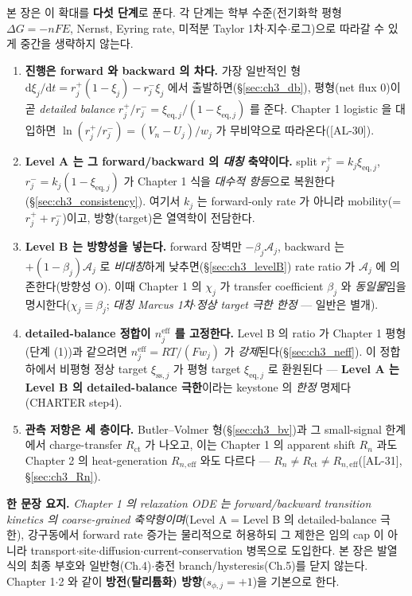 \documentclass[11pt,a4paper]{article}
\newcommand{\dd}{\mathrm{d}}
\newcommand{\eff}{\mathrm{eff}}
\newcommand{\eq}{\mathrm{eq}}
\newcommand{\ct}{\mathrm{ct}}
\newcommand{\sstat}{\mathrm{ss}}
\newcommand{\AL}[1]{\textsf{[AL-#1]}}
\begin{document}
본 장은 이 확대를 \textbf{다섯 단계}로 푼다. 각 단계는 학부 수준(전기화학 평형 $\Delta G=-nF E$, Nernst,
Eyring rate, 미적분 Taylor 1차$\cdot$지수$\cdot$로그)으로 따라갈 수 있게 중간을 생략하지 않는다.
\begin{enumerate}[label=\textbf{(\arabic*)},leftmargin=2.2em]
\item \textbf{진행은 forward 와 backward 의 차다.} 가장 일반적인 형 $\dd\xi_j/\dd t=r_j^+(1-\xi_j)-r_j^-\xi_j$
  에서 출발하면(\S\ref{sec:ch3_db}), 평형(net flux $0$)이 곧 \emph{detailed balance} $r_j^+/r_j^-=\xi_{\eq,j}/(1-\xi_{\eq,j})$
  를 준다. Chapter 1 logistic 을 대입하면 $\ln(r_j^+/r_j^-)=(V_n-U_j)/w_j$ 가 무비약으로 따라온다(\AL{30}).
\item \textbf{Level A 는 그 forward/backward 의 \emph{대칭} 축약이다.} split $r_j^+=k_j\xi_{\eq,j}$,
  $r_j^-=k_j(1-\xi_{\eq,j})$ 가 Chapter 1 식을 \emph{대수적 항등}으로 복원한다(\S\ref{sec:ch3_consistency}).
  여기서 $k_j$ 는 forward-only rate 가 아니라 mobility(=$r_j^++r_j^-$)이고, 방향(target)은 열역학이 전담한다.
\item \textbf{Level B 는 방향성을 넣는다.} forward 장벽만 $-\beta_j\mathcal A_j$, backward 는 $+(1-\beta_j)\mathcal A_j$
  로 \emph{비대칭}하게 낮추면(\S\ref{sec:ch3_levelB}) rate ratio 가 $\mathcal A_j$ 에 의존한다(방향성 O). 이때
  Chapter 1 의 $\chi_j$ 가 transfer coefficient $\beta_j$ 와 \emph{동일물}임을 명시한다($\chi_j\equiv\beta_j$; \emph{대칭 Marcus 1차$\cdot$정상 target 극한 한정} — 일반은 별개).
\item \textbf{detailed-balance 정합이 $n_j^{\eff}$ 를 고정한다.} Level B 의 ratio 가 Chapter 1 평형(단계 (1))과
  같으려면 $n_j^{\eff}=RT/(Fw_j)$ 가 \emph{강제}된다(\S\ref{sec:ch3_neff}). 이 정합 하에서 비평형 정상 target
  $\xi_{\sstat,j}$ 가 평형 target $\xi_{\eq,j}$ 로 환원된다 — \textbf{Level A 는 Level B 의 detailed-balance
  극한}이라는 keystone 의 \emph{한정} 명제다(CHARTER step4).
\item \textbf{관측 저항은 세 층이다.} Butler--Volmer 형(\S\ref{sec:ch3_bv})과 그 small-signal 한계에서
  charge-transfer $R_\ct$ 가 나오고, 이는 Chapter 1 의 apparent shift $R_n$ 과도 Chapter 2 의 heat-generation
  $R_{n,\eff}$ 와도 다르다 — $R_n\ne R_\ct\ne R_{n,\eff}$(\AL{31}, \S\ref{sec:ch3_Rn}).
\end{enumerate}

\noindent\textbf{한 문장 요지.} \emph{Chapter 1 의 relaxation ODE 는 forward/backward transition kinetics 의
coarse-grained 축약형이며}(Level A = Level B 의 detailed-balance 극한), 강구동에서 forward rate 증가는
물리적으로 허용하되 그 제한은 임의 cap 이 아니라 transport$\cdot$site$\cdot$diffusion$\cdot$current-conservation
병목으로 도입한다. 본 장은 발열식의 최종 부호와 일반형(Ch.4)$\cdot$충전 branch/hysteresis(Ch.5)를 닫지 않는다.
Chapter 1$\cdot$2 와 같이 \textbf{방전(탈리튬화) 방향}($s_{\phi,j}=+1$)을 기본으로 한다.
\end{document}
